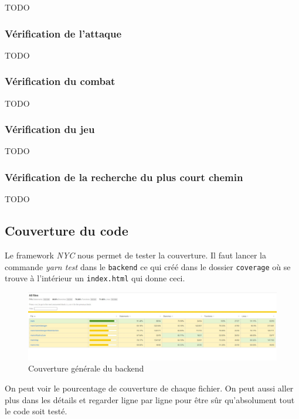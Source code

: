 TODO

\subsubsection{Vérification de l'attaque}

TODO

\subsubsection{Vérification du combat}

TODO

\subsubsection{Vérification du jeu}

TODO

\subsubsection{Vérification de la recherche du plus court chemin}

TODO

\subsection{Couverture du code}

Le framework \emph{NYC} nous permet de tester la couverture. Il faut lancer la commande \emph{yarn test} dans le \lstinline{backend} ce qui créé dans le dossier \lstinline{coverage} où se trouve à l'intérieur un \lstinline{index.html} qui donne ceci.

\begin{figure}[H]
    \centering
    \includegraphics[scale=0.35]{data/couverture_test_1.jpg}
    \caption{Couverture générale du backend}
\end{figure}

On peut voir le pourcentage de couverture de chaque fichier. On peut aussi aller plus dans les détails et regarder ligne par ligne pour être sûr qu'absolument tout le code soit testé.

